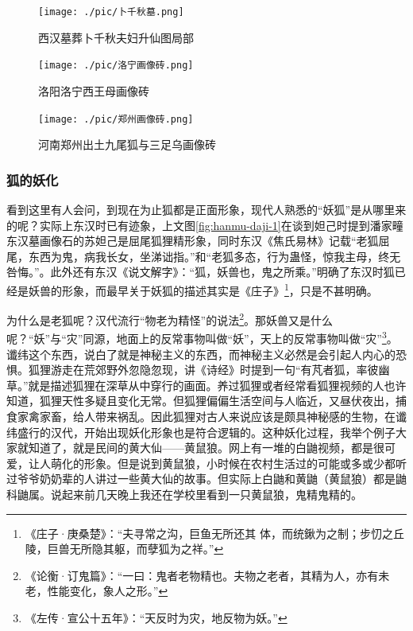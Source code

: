 \documentclass[UTF8, 12pt, A4paper]{article}
\begin{document}
\begin{figure}[ht]
    \centering
    \texttt{[image: ./pic/卜千秋墓.png]}
    \caption{西汉墓葬卜千秋夫妇升仙图局部}
    \label{fig:buqianqiu}
\end{figure}

\begin{figure}[ht]
    \centering
    \texttt{[image: ./pic/洛宁画像砖.png]}
    \caption{洛阳洛宁西王母画像砖}
    \label{fig:luoning}
\end{figure}

\begin{figure}[ht]
    \centering
    \texttt{[image: ./pic/郑州画像砖.png]}
    \caption{河南郑州出土九尾狐与三足乌画像砖}
    \label{fig:zhengzhou}
\end{figure}


\subsubsection{狐的妖化}

看到这里有人会问，到现在为止狐都是正面形象，现代人熟悉的“妖狐”是从哪里来的呢？实际上东汉时已有迹象，上文图\ref{fig:hanmu-daji-1}在谈到妲己时提到潘家疃东汉墓画像石的苏妲己是屈尾狐狸精形象，同时东汉《焦氏易林》记载“老狐屈尾，东西为鬼，病我长女，坐涕诎指。”和“老狐多态，行为蛊怪，惊我主母，终无咎悔。”。此外还有东汉《说文解字》：“狐，妖兽也，鬼之所乘。”明确了东汉时狐已经是妖兽的形象，而最早关于妖狐的描述其实是《庄子》\footnote{《庄子·庚桑楚》：“夫寻常之沟，巨鱼无所还其
体，而统鍬为之制；步忉之丘陵，巨兽无所隐其躯，而孽狐为之祥。”}，只是不甚明确。

为什么是老狐呢？汉代流行“物老为精怪”的说法\footnote{《论衡·订鬼篇》：“一曰：鬼者老物精也。夫物之老者，其精为人，亦有未老，性能变化，象人之形。”}。那妖兽又是什么呢？“妖”与“灾”同源，地面上的反常事物叫做“妖”，天上的反常事物叫做“灾”\footnote{《左传·宣公十五年》：“天反时为灾，地反物为妖。”}。谶纬这个东西，说白了就是神秘主义的东西，而神秘主义必然是会引起人内心的恐惧。狐狸游走在荒郊野外忽隐忽现，讲《诗经》时提到一句“有芃者狐，率彼幽草。”就是描述狐狸在深草从中穿行的画面。养过狐狸或者经常看狐狸视频的人也许知道，狐狸天性多疑且变化无常。但狐狸偏偏生活空间与人临近，又昼伏夜出，捕食家禽家畜，给人带来祸乱。因此狐狸对古人来说应该是颇具神秘感的生物，在谶纬盛行的汉代，开始出现妖化形象也是符合逻辑的。这种妖化过程，我举个例子大家就知道了，就是民间的黄大仙——黄鼠狼。网上有一堆的白鼬视频，都是很可爱，让人萌化的形象。但是说到黄鼠狼，小时候在农村生活过的可能或多或少都听过爷爷奶奶辈的人讲过一些黄大仙的故事。但实际上白鼬和黄鼬（黄鼠狼）都是鼬科鼬属。说起来前几天晚上我还在学校里看到一只黄鼠狼，鬼精鬼精的。
\end{document}
